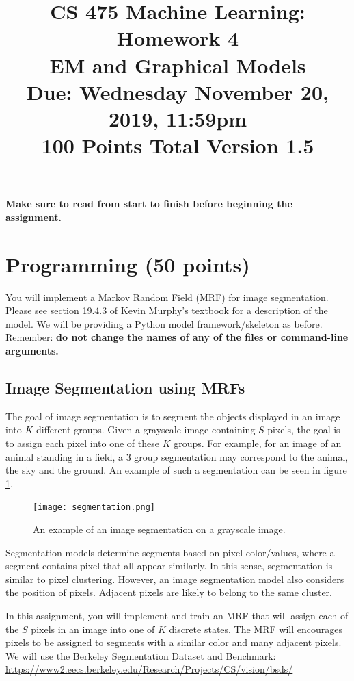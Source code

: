 \documentclass[11pt]{article}
\title{CS 475 Machine Learning: Homework 4\\EM and Graphical Models\\
\Large{Due: Wednesday November 20, 2019, 11:59pm}\\
100 Points Total \hspace{1cm} Version 1.5}
\author{}
\date{}
\begin{document}
\large
\maketitle
\thispagestyle{headings}

\vspace{-.5in}

{\bf Make sure to read from start to finish before beginning the assignment.}

\section{Programming (50 points)}


You will implement a Markov Random Field (MRF) for image segmentation. Please see section 19.4.3 of Kevin Murphy's textbook for a description of the model.
We will be providing a Python model framework/skeleton as before. Remember: \textbf{do not change the names of any of the files or command-line arguments.}

\subsection{Image Segmentation using MRFs}
The goal of image segmentation is to segment the objects displayed in an image into $K$ different groups.
Given a grayscale image containing $S$ pixels, the goal is to assign each pixel into one of these $K$ groups.
For example, for an image of an animal standing in a field, a 3 group segmentation may correspond to the animal, the sky and the ground. An example of such a segmentation can be seen in figure \ref{fig:segmentation}.

\begin{figure}\centering
    \texttt{[image: segmentation.png]}
    \caption{An example of an image segmentation on a grayscale image.}
    \label{fig:segmentation}
\end{figure}


Segmentation models determine segments based on pixel color/values, where a segment contains pixel that all appear similarly. In this sense, segmentation is similar to pixel clustering. However, an image segmentation model also considers the position of pixels. Adjacent pixels are likely to belong to the same cluster.

In this assignment, you will implement and train an MRF that will assign each of the $S$ pixels in an image into one of $K$ discrete states. The MRF will encourages pixels to be assigned to segments with a similar color and many adjacent pixels. We will use the Berkeley Segmentation Dataset and Benchmark: \url{https://www2.eecs.berkeley.edu/Research/Projects/CS/vision/bsds/}
\end{document}
